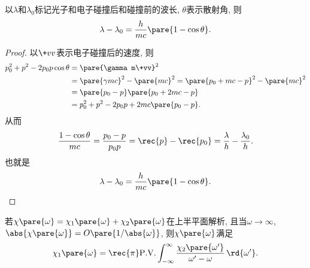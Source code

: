 \documentclass{ctexart}
\begin{document}
\begin{theorem}[Compton效应]
    以$\lambda$和$\lambda_0$标记光子和电子碰撞后和碰撞前的波长, $\theta$表示散射角, 则
    \[ \lambda - \lambda_0 = \frac{h}{mc}\pare{1-\cos\theta}. \]
\end{theorem}
\begin{proof}
    以$\+vv$表示电子碰撞后的速度, 则
    \begin{align*}
        p_0^2 + p^2 - 2p_0p\cos\theta &= \pare{\gamma m\+vv}^2 \\
        &= \pare{\gamma mc}^2 - \pare{mc}^2 = \pare{p_0+mc-p}^2 - \pare{mc}^2 \\
        &= \pare{p_0 - p}\pare{p_0 + 2mc - p} \\
        &= p_0^2 + p^2 - 2p_0p + 2mc\pare{p_0 - p}.
    \end{align*}
    从而
    \[ \frac{1-\cos\theta}{mc} = \frac{p_0-p}{p_0p} = \rec{p} - \rec{p_0} = \frac{\lambda}{h} - \frac{\lambda_0}{h}. \]
    也就是
    \[ \lambda - \lambda_0  = \frac{h}{mc}\pare{1-\cos\theta}. \qedhere \]
\end{proof}

\begin{theorem}
    若$\chi\pare{\omega} = \chi_1\pare{\omega} + \chi_2\pare{\omega}$在上半平面解析, 且当$\omega\rightarrow\infty$, $\abs{\chi\pare{\omega}} = O\pare{1/\abs{\omega}}$, 则$\chi\pare{\omega}$满足
    \[ \chi_1\pare{\omega} = \rec{\pi} \mathrm{ P.V. }\int_{-\infty}^{\infty} \frac{\chi_2\pare{\omega'}}{\omega' - \omega}\,\rd{\omega'}. \]
\end{theorem}
\end{document}
